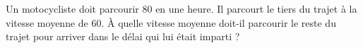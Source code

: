 

\begin{exercice}
Un motocycliste doit parcourir \unit{80}{\kilo\meter} en une heure. Il parcourt le tiers du trajet à la vitesse moyenne de \unit{60}{\kilo\meter\per\hour}. À quelle vitesse moyenne doit-il parcourir le reste du trajet pour arriver dans le délai qui lui était imparti ?
\end{exercice}